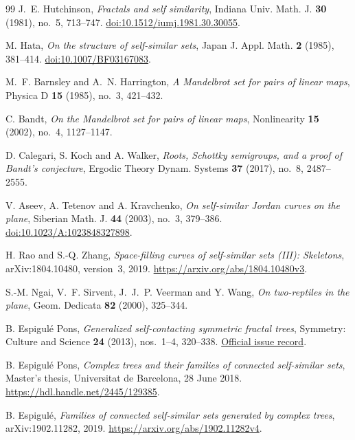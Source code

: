 \begin{thebibliography}{99}
\setlength{\itemsep}{3pt}
J.~E. Hutchinson, \emph{Fractals and self similarity},
Indiana Univ. Math. J. \textbf{30} (1981), no.~5, 713--747.
\href{https://doi.org/10.1512/iumj.1981.30.30055}{doi:10.1512/iumj.1981.30.30055}.

M. Hata, \emph{On the structure of self-similar sets},
Japan J. Appl. Math. \textbf{2} (1985), 381--414.
\href{https://doi.org/10.1007/BF03167083}{doi:10.1007/BF03167083}.

M.~F. Barnsley and A.~N. Harrington,
\emph{A Mandelbrot set for pairs of linear maps},
Physica D \textbf{15} (1985), no.~3, 421--432.

C. Bandt, \emph{On the Mandelbrot set for pairs of linear maps},
Nonlinearity \textbf{15} (2002), no.~4, 1127--1147.

D. Calegari, S. Koch and A. Walker,
\emph{Roots, Schottky semigroups, and a proof of Bandt's conjecture},
Ergodic Theory Dynam. Systems \textbf{37} (2017), no.~8, 2487--2555.

V. Aseev, A. Tetenov and A. Kravchenko,
\emph{On self-similar Jordan curves on the plane},
Siberian Math. J. \textbf{44} (2003), no.~3, 379--386.
\href{https://doi.org/10.1023/A:1023848327898}{doi:10.1023/A:1023848327898}.

H. Rao and S.-Q. Zhang,
\emph{Space-filling curves of self-similar sets (III): Skeletons},
arXiv:1804.10480, version~3, 2019.
\url{https://arxiv.org/abs/1804.10480v3}.

S.-M. Ngai, V.~F. Sirvent, J.~J.~P. Veerman and Y. Wang,
\emph{On two-reptiles in the plane},
Geom. Dedicata \textbf{82} (2000), 325--344.

B. Espigul\'e Pons, \emph{Generalized self-contacting symmetric fractal trees},
Symmetry: Culture and Science \textbf{24} (2013), nos.~1--4, 320--338.
\href{https://journal-scs.symmetry.hu/content-pages/volume-24-numbers-1-4-pages-001-512-2013/}{Official issue record}.

B. Espigul\'e Pons,
\emph{Complex trees and their families of connected self-similar sets},
Master's thesis, Universitat de Barcelona, 28 June 2018.
\url{https://hdl.handle.net/2445/129385}.

B. Espigul\'e,
\emph{Families of connected self-similar sets generated by complex trees},
arXiv:1902.11282, 2019.
\url{https://arxiv.org/abs/1902.11282v4}.


\end{thebibliography}
